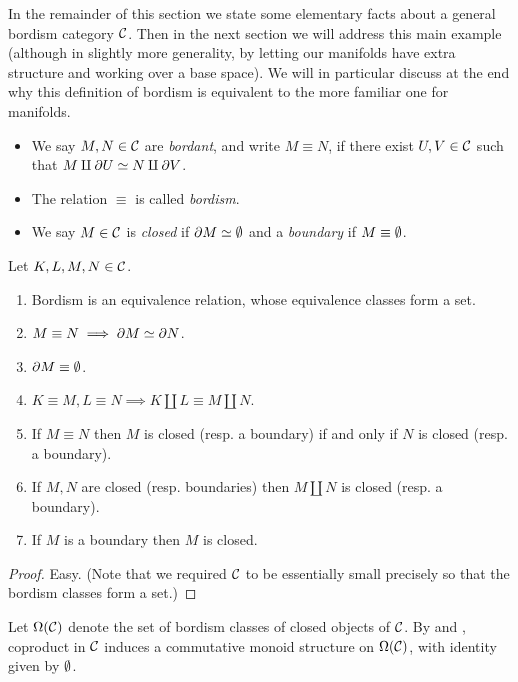 In the remainder of this section we state some elementary facts about
a general bordism category $\mathcal{C}$. Then in the next section we will
address this main example (although in slightly more generality, by
letting our manifolds have extra structure and working over a base
space). We will in particular discuss at the end why this definition
of bordism is equivalent to the more familiar one for manifolds.

\begin{definitions}
  \begin{itemize}[leftmargin=*]
  \item We say $M,N \in \mathcal{C}$ are \emph{bordant}, and write $M \equiv
    N$, if there exist $U,V \in \mathcal{C}$ such that $M \amalg \partial U \simeq N
    \amalg \partial V$.
  \item The relation $\equiv$ is called \emph{bordism}.
  \item We say $M \in \mathcal{C}$ is \emph{closed} if $\partial M \simeq \emptyset$ and a
    \emph{boundary} if $M \equiv \emptyset$.
  \end{itemize}
\end{definitions}

\begin{proposition}
  \label{bordism-props}
  Let $K,L,M,N \in \mathcal{C}$.
  \begin{enumerate}
  \item Bordism is an equivalence relation, whose equivalence classes
    form a set.
  \item $M \equiv N \implies \partial M \simeq \partial N$.
  \item $\partial M \equiv \emptyset$.
  \item \label{bordism-sum} $K \equiv M, L \equiv N \implies K \amalg
    L \equiv M \amalg N$.
  \item If $M \equiv N$ then $M$ is closed (resp. a boundary) if and
    only if $N$ is closed (resp. a boundary).
  \item \label{closed-sum} If $M,N$ are closed (resp. boundaries) then
    $M \amalg N$ is closed (resp. a boundary).
  \item If $M$ is a boundary then $M$ is closed.
  \end{enumerate}
\end{proposition}

\begin{proof}
  Easy. (Note that we required $\mathcal{C}$ to be essentially small precisely
  so that the bordism classes form a set.)
\end{proof}

\begin{definition}
  Let $\Omega(\mathcal{C})$ denote the set of bordism classes of closed objects
  of $\mathcal{C}$. By  and , coproduct in
  $\mathcal{C}$ induces a commutative monoid structure on $\Omega(\mathcal{C})$, with
  identity given by $\emptyset$.
\end{definition}

